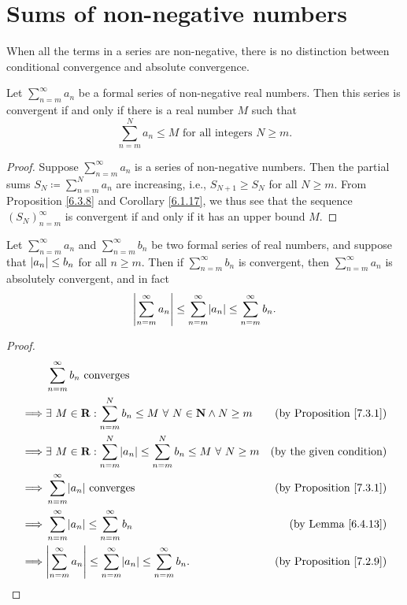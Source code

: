\section{Sums of non-negative numbers}\label{sec 7.3}

\begin{note}
When all the terms in a series are non-negative, there is no distinction between conditional convergence and absolute convergence.
\end{note}

\begin{proposition}\label{7.3.1}
Let \(\sum_{n = m}^\infty a_n\) be a formal series of non-negative real numbers.
Then this series is convergent if and only if there is a real number \(M\) such that
\[
    \sum_{n = m}^N a_n \leq M \text{ for all integers } N \geq m.
\]
\end{proposition}

\begin{proof}
Suppose \(\sum_{n = m}^\infty a_n\) is a series of non-negative numbers.
Then the partial sums \(S_N \coloneqq \sum_{n = m}^N a_n\) are increasing, i.e., \(S_{N + 1} \geq S_N\) for all \(N \geq m\).
From Proposition \ref{6.3.8} and Corollary \ref{6.1.17}, we thus see that the sequence \((S_N)_{n = m}^\infty\) is convergent if and only if it has an upper bound \(M\).
\end{proof}

\begin{corollary}\label{7.3.2}
Let \(\sum_{n = m}^\infty a_n\) and \(\sum_{n = m}^\infty b_n\) be two formal series of real numbers, and suppose that \(\abs*{a_n} \leq b_n\) for all \(n \geq m\).
Then if \(\sum_{n = m}^\infty b_n\) is convergent, then \(\sum_{n = m}^\infty a_n\) is absolutely convergent, and in fact
\[
    \abs*{\sum_{n = m}^\infty a_n} \leq \sum_{n = m}^\infty \abs*{a_n} \leq \sum_{n = m}^\infty b_n.
\]
\end{corollary}

\begin{proof}
\begin{align*}
& \sum_{n = m}^\infty b_n \text{ converges} \\
\implies & \exists\ M \in \mathbf{R} : \sum_{n = m}^N b_n \leq M \ \forall\ N \in \mathbf{N} \land N \geq m & \text{(by Proposition \ref{7.3.1})} \\
\implies & \exists\ M \in \mathbf{R} : \sum_{n = m}^N \abs*{a_n} \leq \sum_{n = m}^N b_n \leq M \ \forall\ N \geq m & \text{(by the given condition)} \\
\implies & \sum_{n = m}^\infty \abs*{a_n} \text{ converges} & \text{(by Proposition \ref{7.3.1})} \\
\implies & \sum_{n = m}^\infty \abs*{a_n} \leq \sum_{n = m}^\infty b_n & \text{(by Lemma \ref{6.4.13})} \\
\implies & \abs*{\sum_{n = m}^\infty a_n} \leq \sum_{n = m}^\infty \abs*{a_n} \leq \sum_{n = m}^\infty b_n. & \text{(by Proposition \ref{7.2.9})}
\end{align*}
\end{proof}

